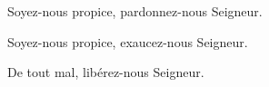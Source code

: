 Soyez-nous propice, pardonnez-nous Seigneur.\par
Soyez-nous propice, exaucez-nous Seigneur.\par
De tout mal, libérez-nous Seigneur.

